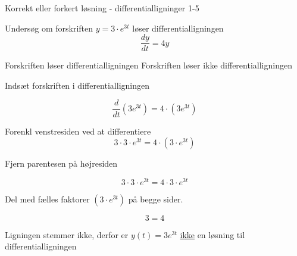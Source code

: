 \documentclass{article}
\begin{document}
\begin{exercise}{Korrekt eller forkert løsning - differentialligninger 1-5}


Undersøg om forskriften $y = 3 \cdot e^{3t}$ løser differentialligningen
\[
\frac{dy}{dt} = 4y
\]

\begin{multichoice}
\itemfalse Forskriften løser differentialligningen
\itemtrue Forskriften løser ikke differentialligningen
\end{multichoice}

\hint

Indsæt forskriften i differentialligningen

\hint
\[
\frac{d}{dt} \left( 3 e^{3t}\right) = 4 \cdot \left( 3 e^{3t} \right)
\]


\hint

Forenkl venstresiden ved at differentiere
\[
3 \cdot 3 \cdot e^{3t} = 4 \cdot \left(3 \cdot e^{3t} \right)
\]

\hint

Fjern parentesen på højresiden

\hint
\[
3 \cdot 3 \cdot e^{3t} = 4 \cdot 3 \cdot e^{3t}
\]

\hint
Del med fælles faktorer $\left( 3 \cdot e^{3t} \right)$ på begge sider.

\hint

\[
3 = 4
\]


\hint

Ligningen stemmer ikke, derfor er $y(t) = 3 e^{3t}$ \underline{ikke} en løsning til differentialligningen

\end{exercise}

\newpage
\end{document}

